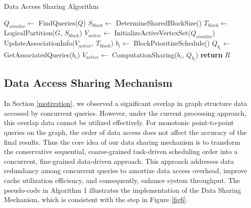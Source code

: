 \documentclass[10pt,journal,compsoc]{IEEEtran}
\begin{document}
\begin{algorithm}[t]
\caption{Data Access Sharing Algorithm}
\label{alg:data_access_sharing}
\begin{algorithmic}[1]
	\State $Q_{similar} \gets$ FindQueries($Q$)
	\State $S_{block} \gets$ DetermineSharedBlockSize()
	\State $T_{block} \gets$ LogicalPartition($G$, $S_{block}$)
	\State $V_{active} \gets$ InitializeActiveVertexSet($Q_{similar}$)
		\State UpdateAssociationInfo($V_{active}$, $T_{block}$)
		\State $b_i \gets$ BlockPrioritizeSchedule()
		\State $Q_{b_i} \gets$ GetAssociatedQueries($b_i$)
		\State $V_{active} \gets$ ComputationSharing($b_i$, $Q_{b_i}$)
	\EndWhile
	\State \textbf{return} $R$
\EndFunction
\end{algorithmic}
\end{algorithm}

\vspace{-8pt}
\subsection{Data Access Sharing Mechanism}\label{3.2}
In Section \ref{motivation}, we observed a significant overlap in graph structure data accessed by concurrent queries. However, under the current processing approach, this overlap data cannot be utilized effectively. For monotonic point-to-point queries on the graph, the order of data access does not affect the accuracy of the final results. Thus the core idea of our data sharing mechanism is to transform the conservative sequential, coarse-grained task-driven scheduling order into a concurrent, fine-grained data-driven approach. This approach addresses data redundancy among concurrent queries to amortize data access overhead, improve cache utilization efficiency, and consequently, enhance system throughput. The pseudo-code in Algorithm 1 illustrates the implementation of the Data Sharing Mechanism, which is consistent with the step in Figure \ref{fig6}.
\end{document}
